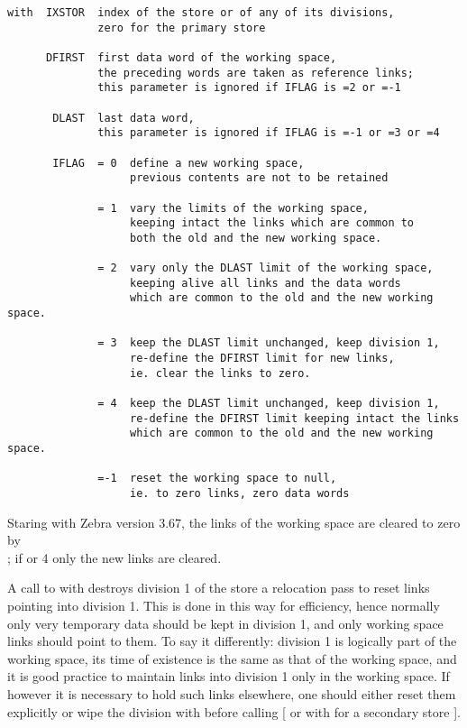 \begin{verbatim}
with  IXSTOR  index of the store or of any of its divisions,
              zero for the primary store

      DFIRST  first data word of the working space,
              the preceding words are taken as reference links;
              this parameter is ignored if IFLAG is =2 or =-1

       DLAST  last data word,
              this parameter is ignored if IFLAG is =-1 or =3 or =4

       IFLAG  = 0  define a new working space,
                   previous contents are not to be retained

              = 1  vary the limits of the working space,
                   keeping intact the links which are common to
                   both the old and the new working space.

              = 2  vary only the DLAST limit of the working space,
                   keeping alive all links and the data words
                   which are common to the old and the new working space.

              = 3  keep the DLAST limit unchanged, keep division 1,
                   re-define the DFIRST limit for new links,    
                   ie. clear the links to zero.             

              = 4  keep the DLAST limit unchanged, keep division 1,
                   re-define the DFIRST limit keeping intact the links
                   which are common to the old and the new working space.

              =-1  reset the working space to null,
                   ie. to zero links, zero data words
\end{verbatim} 
Staring with Zebra version 3.67, the links of the working space
are cleared to zero by \\
; if  or 4 only the new links are cleared.


A call to  with  destroys division 1 of the store
 a relocation pass to reset links pointing into division 1.
This is done in this way for efficiency,
hence normally only very temporary data should be kept in division 1,
and only working space links should point to them.
To say it differently: division 1 is logically part of the
working space,
its time of existence is the same as that of the working space,
and it is good practice to maintain links into division 1
only in the working space.
If however it is necessary to hold such links elsewhere,
one should either reset them explicitly or wipe the division with
 before calling 
[ or with  for a secondary store ].

